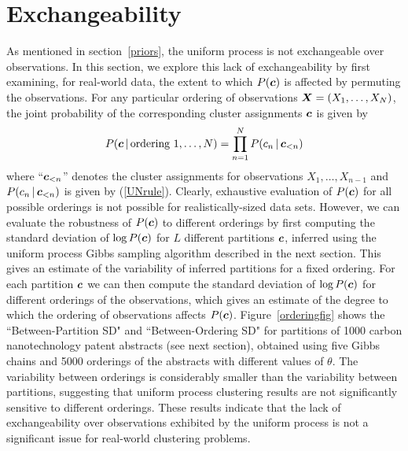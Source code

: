 \documentclass{article}
\begin{document}
\section{Exchangeability}
\label{exchangeability}

As mentioned in section~\ref{priors}, the uniform process is not
exchangeable over observations. In this section, we explore this lack
of exchangeability by first examining, for real-world data, the extent
to which $P(\boldsymbol{c})$ is affected by permuting the observations. For any
particular ordering of observations $\boldsymbol{X} = (X_1, \ldots, X_N)$, the
joint probability of the corresponding cluster assignments $\boldsymbol{c}$ is
given by
\begin{equation}
P(\boldsymbol{c} \,|\, \textrm{ordering $1, \ldots, N$}) = \prod_{n=1}^N P(c_n \,|\, \boldsymbol{c}_{<n})
\end{equation}
where ``$\boldsymbol{c}_{<n}$'' denotes the cluster assignments for observations $X_1,
\ldots, X_{n-1}$ and 
$P(c_n \,|\, \boldsymbol{c}_{<n})$ is given by (\ref{UNrule}). Clearly,
exhaustive evaluation of $P(\boldsymbol{c})$ for all possible orderings is not
possible for realistically-sized data sets. However, we can evaluate
the robustness of $P(\boldsymbol{c})$ to different orderings by first computing
the standard deviation of $\log{P(\boldsymbol{c})}$ for $L$ different partitions
$\boldsymbol{c}$, inferred using the uniform process Gibbs sampling algorithm
described in the next section. This gives an estimate of the
variability of inferred partitions for a fixed ordering. For each
partition $\boldsymbol{c}$ we can then compute the standard deviation of $\log
P(\boldsymbol{c})$ for different orderings of the observations, which gives an
estimate of the degree to which the ordering of observations affects
$P(\boldsymbol{c})$. Figure~\ref{orderingfig} shows the ``Between-Partition SD"
and ``Between-Ordering SD" for partitions of 1000 carbon
nanotechnology patent abstracts (see next section), obtained using
five Gibbs chains and 5000 orderings of the abstracts with different values of
$\theta$.  The variability between orderings is considerably smaller
than the variability between partitions, suggesting that uniform
process clustering results are not significantly sensitive to different
orderings. These results indicate that the lack of exchangeability
over observations exhibited by the uniform process is not a
significant issue for real-world clustering problems.
\end{document}
